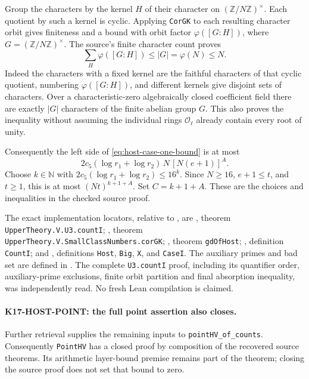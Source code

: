 \documentclass[11pt,a4paper]{article}
\theoremstyle{definition}
\begin{document}
Group the characters by the kernel \(H\) of their character on
\((\mathbb Z/N\mathbb Z)^\times\).  Each quotient by such a kernel is
cyclic.  Applying \texttt{CorGK} to each resulting character orbit gives
finiteness and a bound with orbit factor \(\varphi([G:H])\), where
\(G=(\mathbb Z/N\mathbb Z)^\times\).  The source's finite character
count proves
\[
 \sum_H\varphi([G:H])\le |G|=\varphi(N)\le N.
\]
Indeed the characters with a fixed kernel are the faithful characters
of that cyclic quotient, numbering \(\varphi([G:H])\), and different
kernels give disjoint sets of characters.  Over a characteristic-zero
algebraically closed coefficient field there are exactly \(|G|\)
characters of the finite abelian group \(G\).  This also proves the
inequality without assuming the individual rings \(\mathcal O_\ell\)
already contain every root of unity.

Consequently the left side of \eqref{eq:host-case-one-bound} is at most
\[
 2c_5(\log r_1+\log r_2)\,N\,[N(e+1)]^A.
\]
Choose \(k\in\mathbb N\) with
\(2c_5(\log r_1+\log r_2)\le16^k\).
Since \(N\ge16\), \(e+1\le t\), and \(t\ge1\), this is at most
\((Nt)^{k+1+A}\).  Set \(C=k+1+A\).
These are the choices and inequalities in the checked source proof.

The exact implementation locators, relative to
, are
, theorem
\texttt{UpperTheory.V.U3.countI};
, theorem
\texttt{UpperTheory.V.SmallClassNumbers.corGK};
, theorem \texttt{gdOfHost};
, definition \texttt{CountI};
and ,
definitions \texttt{Host}, \texttt{Big}, \texttt{X}, and \texttt{CaseI}.
The auxiliary primes and bad set are defined in .
The complete \texttt{U3.countI} proof, including its quantifier order,
auxiliary-prime exclusions, finite orbit partition and final absorption
inequality, was independently read.  No fresh Lean compilation is
claimed.

\paragraph{K17-HOST-POINT: the full point assertion also closes.}
Further retrieval supplies the remaining inputs to
\texttt{pointHV\_of\_counts}.  Consequently \texttt{PointHV} has a
closed proof by composition of the recovered source theorems.  Its
arithmetic layer-bound premise remains part of the theorem; closing
the source proof does not set that bound to zero.
\end{document}
